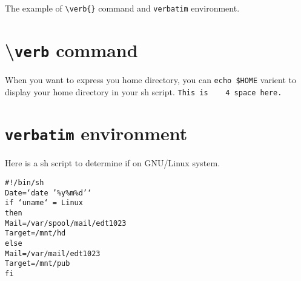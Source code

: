 \documentclass{article}
\begin{document}
The example of \verb|\verb{}| command and \texttt{verbatim} environment.
\section{\textbackslash{}\texttt{verb} command}
When you want to express you home directory, you can \verb|echo $HOME|
varient to display your home directory in your sh script.
\noindent
\verb*|This is    4 space here.|
\section{\texttt{verbatim} environment}
Here is a sh script to determine if on GNU/Linux system.
\begin{verbatim}
#!/bin/sh
Date=‘date ’%y%m%d’‘
if ‘uname‘ = Linux
then
Mail=/var/spool/mail/edt1023
Target=/mnt/hd
else
Mail=/var/mail/edt1023
Target=/mnt/pub
fi
\end{verbatim}
\end{document}
